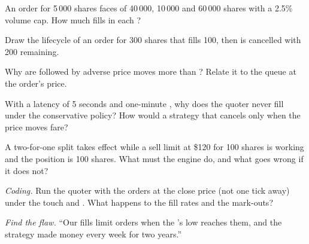 \begin{exercise}[$\star$]\label{exo:rs:event-driven-backtests:2}
An order for 5\,000 shares faces  of 40\,000, 10\,000 and 60\,000 shares with a 2.5\% volume cap. How much fills in each ?
\end{exercise}

\begin{exercise}[$\star$]\label{exo:rs:event-driven-backtests:3}
Draw the lifecycle of an order for 300 shares that fills 100, then is cancelled with 200 remaining.
\end{exercise}

\begin{exercise}[$\star\star$]\label{exo:rs:event-driven-backtests:4}
Why are  followed by adverse price moves more than ? Relate it to the queue at the order's price.
\end{exercise}

\begin{exercise}[$\star\star$]\label{exo:rs:event-driven-backtests:5}
With a latency of 5 seconds and one-minute , why does the quoter never fill under the conservative policy? How would a strategy that cancels only when
the price moves fare?
\end{exercise}

\begin{exercise}[$\star\star$]\label{exo:rs:event-driven-backtests:6}
A two-for-one split takes effect while a sell limit at \$120 for 100 shares is working and the position is 100 shares. What must the engine do, and what
goes wrong if it does not?
\end{exercise}

\begin{exercise}[$\star\star\star$]\label{exo:rs:event-driven-backtests:7}
\emph{Coding.} Run the quoter with the orders at the close price (not one tick away) under the touch and . What happens to the fill rates and
the mark-outs?
\end{exercise}

\begin{exercise}[$\star\star\star$]\label{exo:rs:event-driven-backtests:8}
\emph{Find the flaw.} ``Our  fills limit orders when the 's low reaches them, and the strategy made money every week for two years.''
\end{exercise}


